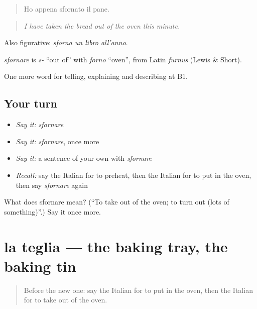 \begin{quote}
Ho appena sfornato il pane.
\end{quote}

\begin{quote}
\emph{I have taken the bread out of the oven this minute.}
\end{quote}

Also figurative: \emph{sforna un libro all'anno}.

\begin{cousinweb}
\emph{sfornare} is \emph{s-} \textquotedblleft{}out of\textquotedblright{} with \emph{forno} \textquotedblleft{}oven\textquotedblright{}, from Latin \emph{furnus} (Lewis \& Short).
\end{cousinweb}

\begin{grammarlens}[title={What you've built}]
One more word for telling, explaining and describing at B1.
\end{grammarlens}

\subsection*{Your turn}
\begin{itemize}
\raggedright
  \item \emph{Say it:} \emph{sfornare}
  \item \emph{Say it:} \emph{sfornare}, once more
  \item \emph{Say it:} a sentence of your own with \emph{sfornare}
  \item \emph{Recall:} say the Italian for to preheat, then the Italian for to put in the oven, then say \emph{sfornare} again
\end{itemize}

\begin{tcolorbox}[breakable,colback=teal!4,colframe=teal!35!black,title={Before you move on}]
What does sfornare mean? (\textquotedblleft{}To take out of the oven; to turn out (lots of something)\textquotedblright{}.) Say it once more.
\end{tcolorbox}
\section[la teglia]{la teglia — the baking tray, the baking tin}

\label{lesson:IT-C336-teglia}



\begin{quote}
Before the new one: say the Italian for to put in the oven, then the Italian for to take out of the oven.
\end{quote}

